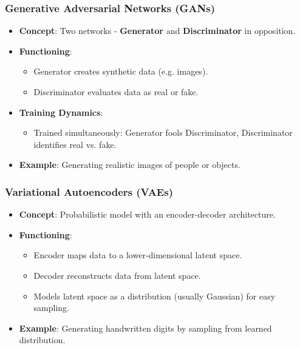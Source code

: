\documentclass[aspectratio=169]{beamer}
\begin{document}
\begin{frame}[fragile]
    \frametitle{Generative Adversarial Networks (GANs)}
    \begin{itemize}
        \item \textbf{Concept}: Two networks - \textbf{Generator} and \textbf{Discriminator} in opposition.
        \item \textbf{Functioning}:
        \begin{itemize}
            \item Generator creates synthetic data (e.g. images).
            \item Discriminator evaluates data as real or fake.
        \end{itemize}
        \item \textbf{Training Dynamics}:
        \begin{itemize}
            \item Trained simultaneously: Generator fools Discriminator, Discriminator identifies real vs. fake.
        \end{itemize}
        \item \textbf{Example}: Generating realistic images of people or objects.
    \end{itemize}
\end{frame}

\begin{frame}[fragile]
    \frametitle{Variational Autoencoders (VAEs)}
    \begin{itemize}
        \item \textbf{Concept}: Probabilistic model with an encoder-decoder architecture.
        \item \textbf{Functioning}:
        \begin{itemize}
            \item Encoder maps data to a lower-dimensional latent space.
            \item Decoder reconstructs data from latent space.
            \item Models latent space as a distribution (usually Gaussian) for easy sampling.
        \end{itemize}
        \item \textbf{Example}: Generating handwritten digits by sampling from learned distribution.
    \end{itemize}
\end{frame}
\end{document}
